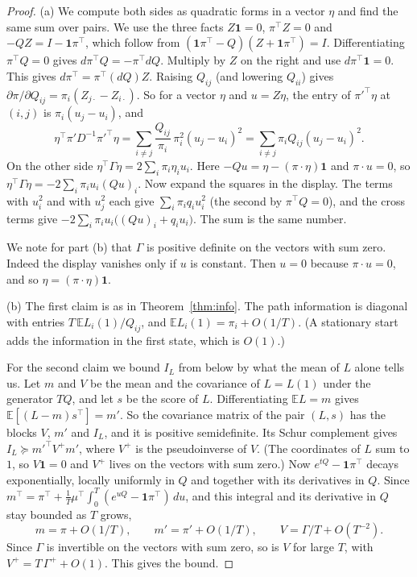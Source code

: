 \documentclass[11pt]{article}
\theoremstyle{definition}
\theoremstyle{remark}
\newcommand{\E}{\mathbb E}
\newcommand{\one}{\mathbf 1}
\begin{document}
\begin{proof}
(a) We compute both sides as quadratic forms in a vector $\eta$ and find the
same sum over pairs. We use the three facts $Z\one=0$, $\pi^{\top}Z=0$ and
$-QZ=I-\one\pi^{\top}$, which follow from
$(\one\pi^{\top}-Q)(Z+\one\pi^{\top})=I$. Differentiating $\pi^{\top}Q=0$ gives
$d\pi^{\top}Q=-\pi^{\top}dQ$. Multiply by $Z$ on the right and use
$d\pi^{\top}\one=0$. This gives $d\pi^{\top}=\pi^{\top}(dQ)Z$. Raising $Q_{ij}$ (and lowering $Q_{ii}$)
gives $\partial\pi/\partial Q_{ij}=\pi_i(Z_{j\cdot}-Z_{i\cdot})$. So for a
vector $\eta$ and $u=Z\eta$, the entry of $\pi'^{\top}\eta$ at $(i,j)$ is
$\pi_i(u_j-u_i)$, and
\[
 \eta^{\top}\pi'D^{-1}\pi'^{\top}\eta=\sum_{i\ne j}\frac{Q_{ij}}{\pi_i}\,
 \pi_i^2(u_j-u_i)^2=\sum_{i\ne j}\pi_iQ_{ij}(u_j-u_i)^2 .
\]
On the other side $\eta^{\top}\Gamma\eta=2\sum_i\pi_i\eta_iu_i$. Here
$-Qu=\eta-(\pi\cdot\eta)\one$ and $\pi\cdot u=0$, so
$\eta^{\top}\Gamma\eta=-2\sum_i\pi_iu_i(Qu)_i$. Now expand the squares in the
display. The terms with $u_i^2$ and with $u_j^2$ each give $\sum_i\pi_iq_iu_i^2$
(the second by $\pi^{\top}Q=0$), and the cross terms give
$-2\sum_i\pi_iu_i\bigl((Qu)_i+q_iu_i\bigr)$. The sum is the same number.

We note for part (b) that $\Gamma$ is positive definite on the vectors with sum
zero. Indeed the display vanishes only if $u$ is constant. Then $u=0$ because
$\pi\cdot u=0$, and so $\eta=(\pi\cdot\eta)\one$.

(b) The first claim is as in Theorem~\ref{thm:info}. The path information is
diagonal with entries $T\,\E L_i(1)/Q_{ij}$, and $\E L_i(1)=\pi_i+O(1/T)$. (A
stationary start adds the information in the first state, which is $O(1)$.)

For the second claim we bound $I_L$ from below by what the mean of $L$ alone
tells us. Let $m$ and $V$ be the mean and the covariance of $L=L(1)$ under the
generator $TQ$, and let $s$ be the score of $L$. Differentiating $\E L=m$ gives
$\E[(L-m)s^{\top}]=m'$. So the covariance matrix of the pair $(L,s)$ has the
blocks $V$, $m'$ and $I_L$, and it is positive semidefinite. Its Schur
complement gives $I_L\succeq m'^{\top}V^{+}m'$, where $V^{+}$ is the
pseudoinverse of $V$. (The coordinates of $L$ sum to $1$, so $V\one=0$ and
$V^{+}$ lives on the vectors with sum zero.) Now $e^{tQ}-\one\pi^{\top}$ decays
exponentially, locally uniformly in $Q$ and together with its derivatives in
$Q$. Since $m^{\top}=\pi^{\top}+\frac1T\mu^{\top}\int_0^T(e^{uQ}-\one\pi^{\top})\,du$,
and this integral and its derivative in $Q$ stay bounded as $T$ grows,
\[
m=\pi+O(1/T),\qquad m'=\pi'+O(1/T),\qquad V=\Gamma/T+O(T^{-2}).
\]
Since $\Gamma$ is invertible on the vectors with sum zero, so is $V$ for large
$T$, with $V^{+}=T\,\Gamma^{+}+O(1)$. This gives the bound.


\end{proof}
\end{document}
